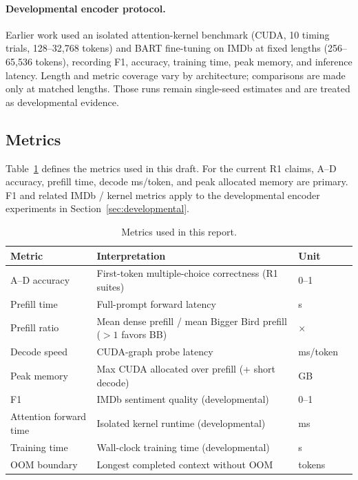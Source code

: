 \documentclass[11pt]{article}
\begin{document}
\paragraph{Developmental encoder protocol.}
Earlier work used an isolated attention-kernel benchmark (CUDA, 10 timing
trials, 128--32{,}768 tokens) and BART fine-tuning on IMDb at fixed lengths
(256--65{,}536 tokens), recording F1, accuracy, training time, peak memory,
and inference latency. Length and metric coverage vary by architecture;
comparisons are made only at matched lengths. Those runs remain single-seed
estimates and are treated as developmental evidence.

\subsection{Metrics}
\label{sec:metrics}

Table~\ref{tab:metrics} defines the metrics used in this draft. For the
current R1 claims, A--D accuracy, prefill time, decode ms/token, and peak
allocated memory are primary. F1 and related IMDb / kernel metrics apply to
the developmental encoder experiments in Section~\ref{sec:developmental}.

\begin{table}[ht]
  \centering
  \small
  \caption{Metrics used in this report.}
  \label{tab:metrics}
  \begin{tabularx}{\textwidth}{@{}lXll@{}}
    \toprule
    Metric & Interpretation & Unit \\
    \midrule
    A--D accuracy & First-token multiple-choice correctness (R1 suites) & 0--1 \\
    Prefill time & Full-prompt forward latency & s \\
    Prefill ratio & Mean dense prefill / mean Bigger Bird prefill
      ($>1$ favors BB) & $\times$ \\
    Decode speed & CUDA-graph probe latency & ms/token \\
    Peak memory & Max CUDA allocated over prefill (+ short decode) & GB \\
    F1 & IMDb sentiment quality (developmental) & 0--1 \\
    Attention forward time & Isolated kernel runtime (developmental) & ms \\
    Training time & Wall-clock training time (developmental) & s \\
    OOM boundary & Longest completed context without OOM & tokens \\
    \bottomrule
  \end{tabularx}
\end{table}
\end{document}
